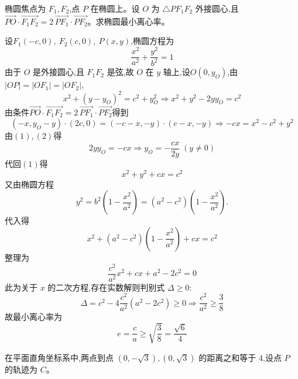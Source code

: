 \begin{questions}
    \question 椭圆焦点为 \(F_1,F_2\),点 \(P\) 在椭圆上。设 \(O\) 为 \(\triangle PF_1F_2\) 外接圆心,且
        \(\overrightarrow{PO}\cdot\overrightarrow{F_1F_2}=2\,\overrightarrow{PF_1}\cdot\overrightarrow{PF_2}\)。求椭圆最小离心率。  
    \begin{solution}
        设$F_1(-c,0),\ F_2(c,0),\ P(x,y)$,椭圆方程为
        \[
        \frac{x^2}{a^2} + \frac{y^2}{b^2} = 1
        \]
        由于 \(O\) 是外接圆心,且 \(F_1F_2\) 是弦,故 \(O\) 在 \(y\) 轴上,设$O(0,y_O)$,由$|OP| = |OF_1| = |OF_2|,$
        \[
        x^2 + (y - y_O)^2 = c^2 + y_O^2 \Rightarrow x^2 + y^2 - 2 y y_O = c^2 \tag{1}
        \]
        由条件$\overrightarrow{PO}\cdot\overrightarrow{F_1F_2}=2\,\overrightarrow{PF_1}\cdot\overrightarrow{PF_2}$得到
        \[
        (-x, y_O - y)\cdot(2c,0)=(-c - x, -y)\cdot(c - x, -y)\Rightarrow -c x = x^2 - c^2 + y^2 \tag{2}
        \]
        由$(1),(2)$得
        \[
        2 y y_O = - c x\Rightarrow y_O = -\frac{c x}{2 y}\;(y \neq 0)
        \]
        代回$(1)$得
        \[
        x^2 + y^2 + c x = c^2
        \]
        又由椭圆方程
        \[
        y^2 = b^2 \left(1 - \frac{x^2}{a^2}\right) = (a^2 - c^2) \left(1 - \frac{x^2}{a^2}\right).
        \]
        代入得
        \[
        x^2 + (a^2 - c^2)\left(1 - \frac{x^2}{a^2}\right) + c x = c^2
        \]
        整理为
        \[
        \frac{c^2}{a^2} x^2 + c x + a^2 - 2 c^2 = 0
        \]
        此为关于 \(x\) 的二次方程,存在实数解则判别式 \(\Delta \geq 0\):
        \[
        \Delta = c^2 - 4 \frac{c^2}{a^2} (a^2 - 2 c^2) \geq 0 \Rightarrow \frac{c^2}{a^2} \geq \frac{3}{8}
        \]
        故最小离心率为
        \[
        e = \frac{c}{a} \geq \sqrt{\frac{3}{8}} = \frac{\sqrt{6}}{4}
        \]
    \end{solution}

    \question 在平面直角坐标系中,两点到点 $(0, -\sqrt{3}),(0, \sqrt{3})$ 的距离之和等于 4,设点 $P$ 的轨迹为 $C$。
\end{questions}
